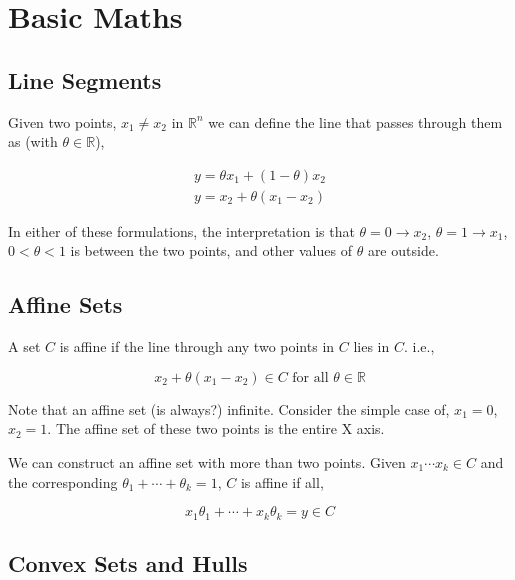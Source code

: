 \documentclass{article}
\begin{document}
\noindent{}
\tableofcontents

\section{Basic Maths}

\subsection{Line Segments}

Given two points, $x_1 \ne x_2$ in $\mathbb{R}^n$ we can define the line that passes through them as (with $\theta \in \mathbb{R}$),

\begin{align}
    y = \theta x_1 + (1 - \theta) x_2 \\
    y = x_2 + \theta ( x_1 - x_2)
\end{align}

\noindent
In either of these formulations, the interpretation is that
$\theta = 0 \rightarrow x_2$,
$\theta = 1 \rightarrow x_1$,
$0 < \theta < 1$ is between the two points,
and other values of $\theta$ are outside.

\subsection{Affine Sets}

A set $C$ is affine if the line through any two points in $C$ lies in $C$. i.e.,

\begin{equation}
    x_2 + \theta (x_1 - x_2 ) \in C \text{ for all } \theta \in \mathbb{R}
\end{equation}

Note that an affine set (is always?) infinite. Consider the simple case of, $x_1 = 0$, $x_2 = 1$. The affine set of these two points is the entire X axis.

We can construct an affine set with more than two points. Given $x_1 \cdots x_k \in C$ and the corresponding $\theta_1 + \cdots + \theta_k = 1$, $C$ is affine if all,

\begin{equation}
    x_1 \theta_1 + \cdots + x_k \theta_k = y \in C
\end{equation}

\subsection{Convex Sets and Hulls}
\end{document}

